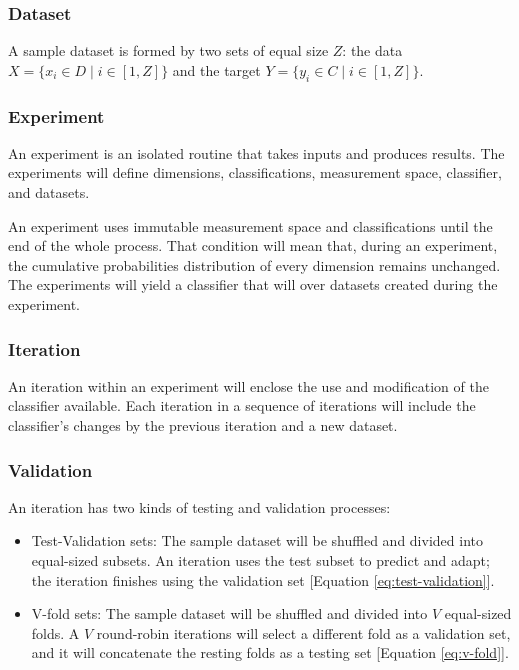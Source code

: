 \documentclass[letterpaper, conference]{IEEEtran}
\begin{document}
\subsubsection{Dataset}
A sample dataset is formed by two sets of equal size $Z$: the data $ X = \{x_i \in D \mid i \in [1, Z]\}$ and the target $Y = \{ y_i \in C \mid i \in [1, Z]\}$.

\subsubsection{Experiment}
An experiment is an isolated routine that takes inputs and produces results. The experiments will define dimensions, classifications, measurement space, classifier, and datasets.

An experiment uses immutable measurement space and classifications until the end of the whole process. That condition will mean that, during an experiment, the cumulative probabilities distribution of every dimension remains unchanged. The experiments will yield a classifier that will over datasets created during the experiment.

\subsubsection{Iteration}
An iteration within an experiment will enclose the use and modification of the classifier available. Each iteration in a sequence of iterations will include the classifier's changes by the previous iteration and a new dataset.

\subsubsection{Validation}
An iteration has two kinds of testing and validation processes:
\begin{itemize}
  \item Test-Validation sets: The sample dataset will be shuffled and divided into equal-sized subsets. An iteration uses the test subset to predict and adapt; the iteration finishes using the validation set [Equation \ref{eq:test-validation}].
  \item V-fold sets: The sample dataset will be shuffled and divided into $V$ equal-sized folds. A $V$ round-robin iterations will select a different fold as a validation set, and it will concatenate the resting folds as a testing set [Equation \ref{eq:v-fold}].
\end{itemize}
\end{document}

